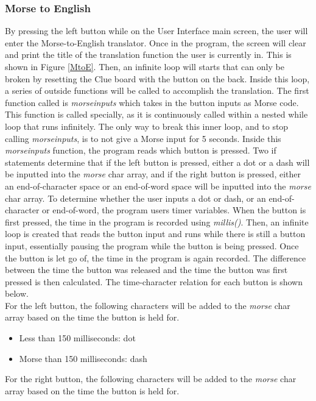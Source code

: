 \documentclass[12pt]{article}
\begin{document}
\subsubsection{Morse to English}
By pressing the left button while on the User Interface main screen, the user will enter the Morse-to-English translator. Once in the program, the screen will clear and print the title of the translation function the user is currently in. This is shown in Figure \ref{MtoE}. Then, an infinite loop will starts that can only be broken by resetting the Clue board with the button on the back. Inside this loop, a series of outside functions will be called to accomplish the translation. The first function called is \emph{morseinputs} which takes in the button inputs as Morse code. This function is called specially, as it is continuously called within a nested while loop that runs infinitely. The only way to break this inner loop, and to stop calling \emph{morseinputs}, is to not give a Morse input for 5 seconds. Inside this \emph{morseinputs} function, the program reads which button is pressed. Two if statements determine that if the left button is pressed, either a dot or a dash will be inputted into the \emph{morse} char array, and if the right button is pressed, either an end-of-character space or an end-of-word space will be inputted into the \emph{morse} char array. To determine whether the user inputs a dot or dash, or an end-of-character or end-of-word, the program users timer variables. When the button is first pressed, the time in the program is recorded using \emph{millis()}. Then, an infinite loop is created that reads the button input and runs while there is still a button input, essentially pausing the program while the button is being pressed. Once the button is let go of, the time in the program is again recorded. The difference between the time the button was released and the time the button was first pressed is then calculated. The time-character relation for each button is shown below.\\
For the left button, the following characters will be added to the \emph{morse} char array based on the time the button is held for.
\begin{itemize}
    \item Less than 150 milliseconds: dot
    \item Morse than 150 milliseconds: dash
\end{itemize}
For the right button, the following characters will be added to the \emph{morse} char array based on the time the button is held for.
\end{document}
